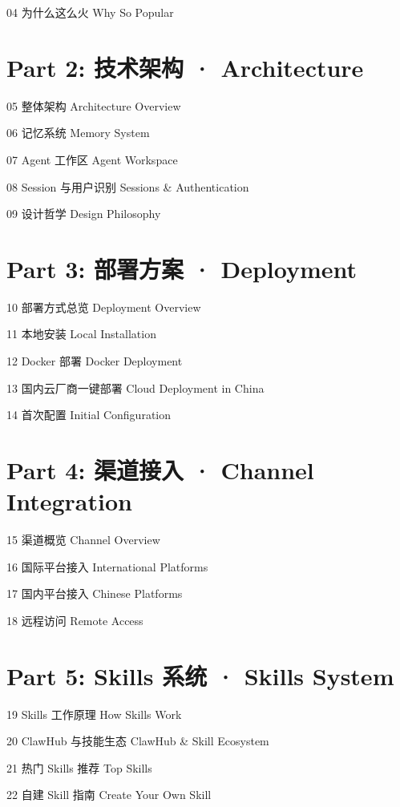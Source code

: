 \documentclass[
  10
]{article}
\begin{document}
04 为什么这么火 Why So Popular

\section{Part 2: 技术架构 ·
Architecture}\label{part-2-ux6280ux672fux67b6ux6784-architecture}

05 整体架构 Architecture Overview

06 记忆系统 Memory System

07 Agent 工作区 Agent Workspace

08 Session 与用户识别 Sessions \& Authentication

09 设计哲学 Design Philosophy

\section{Part 3: 部署方案 ·
Deployment}\label{part-3-ux90e8ux7f72ux65b9ux6848-deployment}

10 部署方式总览 Deployment Overview

11 本地安装 Local Installation

12 Docker 部署 Docker Deployment

13 国内云厂商一键部署 Cloud Deployment in China

14 首次配置 Initial Configuration

\section{Part 4: 渠道接入 · Channel
Integration}\label{part-4-ux6e20ux9053ux63a5ux5165-channel-integration}

15 渠道概览 Channel Overview

16 国际平台接入 International Platforms

17 国内平台接入 Chinese Platforms

18 远程访问 Remote Access

\section{Part 5: Skills 系统 · Skills
System}\label{part-5-skills-ux7cfbux7edf-skills-system}

19 Skills 工作原理 How Skills Work

20 ClawHub 与技能生态 ClawHub \& Skill Ecosystem

21 热门 Skills 推荐 Top Skills

22 自建 Skill 指南 Create Your Own Skill
\end{document}
